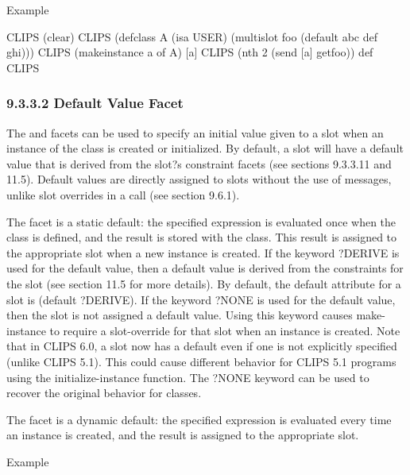 \documentclass[letterpaper,10pt,english]{sphinxmanual}
\begin{document}
Example

\begin{sphinxVerbatim}[commandchars=\\\{\}]
CLIPS\PYGZgt{} (clear)
CLIPS\PYGZgt{}
(defclass A (is\PYGZhy{}a USER)
  (multislot foo
  (default abc def ghi)))
CLIPS\PYGZgt{} (make\PYGZhy{}instance a of A)
[a]
CLIPS\PYGZgt{} (nth\PYGZdl{} 2 (send [a] get\PYGZhy{}foo))
def
CLIPS\PYGZgt{}
\end{sphinxVerbatim}


\subsubsection{9.3.3.2 Default Value Facet}
\label{\detokenize{cool:default-value-facet}}
The  and  facets can be used to specify an
initial value given to a slot when an instance of the class is created
or initialized. By default, a slot will have a default value that is
derived from the slot?s constraint facets (see sections 9.3.3.11 and
11.5). Default values are directly assigned to slots without the use of
messages, unlike slot overrides in a  call (see section
9.6.1).

The  facet is a static default: the specified expression is
evaluated once when the class is defined, and the result is stored with
the class. This result is assigned to the appropriate slot when a new
instance is created. If the keyword ?DERIVE is used for the default
value, then a default value is derived from the constraints for the slot
(see section 11.5 for more details). By default, the default attribute
for a slot is (default ?DERIVE). If the keyword ?NONE is used for the
default value, then the slot is not assigned a default value. Using this
keyword causes make-instance to require a slot-override for that slot
when an instance is created. Note that in CLIPS 6.0, a slot now has a
default even if one is not explicitly specified (unlike CLIPS 5.1). This
could cause different behavior for CLIPS 5.1 programs using the
initialize-instance function. The ?NONE keyword can be used to recover
the original behavior for classes.

The  facet is a dynamic default: the specified
expression is evaluated every time an instance is created, and the
result is assigned to the appropriate slot.

Example
\end{document}
